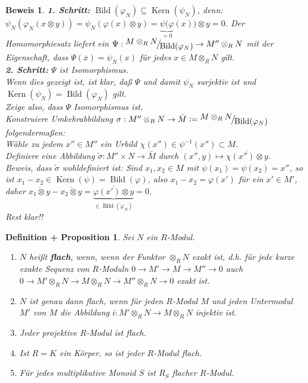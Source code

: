\documentclass[a4paper,12pt]{scrbook}
\theoremstyle{break}
\newtheorem{DefProp}[Def]{Definition + Proposition}
\theoremstyle{nonumberbreak}
\newtheorem{Bew}{Beweis}
\theoremstyle{nonumberplain}
\newcommand{\emp}[1]{\textbf{\emph{#1}}}
\newcommand{\defeqr}[0]{\mathrel{\mathop:}=}
\DeclareMathOperator{\Kern}{Kern}
\DeclareMathOperator{\Bild}{Bild}
\newcommand{\FakRaum}[2]{
  \raisebox{0.7ex}{\ensuremath{#1}}
  \ensuremath{\mkern-3mu}\big/\ensuremath{\mkern-3mu}
  \raisebox{-0.6ex}{\ensuremath{#2}}}
\begin{document}
\begin{Bew} 
  \textbf{1. Schritt:} $\Bild(\varphi_N) \subseteq \Kern(\psi_N)$,
  denn: $\psi_N(\varphi_N(x \otimes y)) = \psi_N(\varphi(x) \otimes y) =
  \underset{=0}{\underbrace{\psi(\varphi}}(x)) \otimes y = 0$. Der Homomorphiesatz
  liefert ein $\Psi: \FakRaum{M \otimes_R N}{\Bild(\varphi_N)} \to M'' \otimes_R N$ mit
  der Eigenschaft, dass $\Psi\left(\overline x\right) = \psi_N\left(x\right)$ für jedes
  $x\in M\otimes_R N$ gilt.\\
  \textbf{2. Schritt:} $\Psi$ ist Isomorphismus.\\
  Wenn dies gezeigt ist, ist klar, daß $\Psi$ und damit $\psi_N$ surjektiv ist und $\Kern(\psi_N) =
  \Bild(\varphi_N)$ gilt.\\
  Zeige also, dass $\Psi$ Isomorphismus ist.\\
  Konstruiere Umkehrabbildung $\sigma: M'' \otimes_R N \to \bar{M} \defeqr \FakRaum{M
  \otimes_R N}{\Bild(\varphi_N)}$ folgendermaßen:\\
  Wähle zu jedem $x'' \in M''$ ein Urbild $\chi(x'') \in \psi^{-1}(x'') \subset M$.\\
  Definiere eine Abbildung $\tilde{\sigma}: M'' \times N \to \bar{M}$ durch $(x'', y) \mapsto
  \overline{\chi(x'') \otimes y}$.\\
  Beweis, dass $\tilde{\sigma}$ wohldefiniert ist:
  Sind $x_1,x_2 \in M$ mit $\psi(x_1) = \psi(x_2) = x''$, so ist $x_1-x_2 \in \Kern\left(\psi\right)
  = \Bild\left(\varphi\right)$, also $x_1-x_2=\varphi(x')$ für ein $x'\in M'$, daher $\overline{x_1
  \otimes y} - \overline{x_2 \otimes y} = \underbrace{\overline{\varphi(x') \otimes y}}_{\in \Bild(\varphi_N)} = 0$.\\
  Rest klar!!
\end{Bew}


\begin{DefProp}
\label{1.13}
  Sei $N$ ein $R$-Modul.
  \begin{enumerate}
    \item $N$ hei\ss t \emp{flach}, wenn, wenn der Funktor $\otimes_R N$ exakt ist,
    d.h. für jede kurze exakte Sequenz von $R$-Moduln 
    $0\to M'\to M\to M''\to 0$
    auch $0\to M'\otimes_R N\to M\otimes_R N\to M''\otimes_R N\to 0$ exakt ist.
    \item $N$ ist genau dann flach, wenn für jeden $R$-Modul $M$ und jeden Untermodul $M'$ von $M$
    die Abbildung $i:M'\otimes_R N\to M\otimes_R N$ injektiv ist.
    \item Jeder projektive $R$-Modul ist flach.
    \item Ist $R=K$ ein Körper, so ist jeder $R$-Modul flach.
    \item Für jedes multiplikative Monoid $S$ ist $R_S$ flacher $R$-Modul.
  \end{enumerate}
\end{DefProp}
\end{document}
